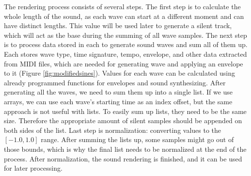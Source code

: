 \documentclass[runningheads]{llncs}
\begin{document}
The rendering process consists of several steps. The first step is to calculate the whole length of the sound, as each wave can start at a different moment and can have distinct lengths. This value will be used later to generate a silent track, which will act as the base during the summing of all wave samples. The next step is to process data stored in each  to generate sound waves and sum all of them up. Each  stores wave type, time signature, tempo, envelope, and other data extracted from MIDI files, which are needed for generating wave and applying an envelope to it (Figure \ref{fig:modifiedsines}). Values for each wave can be calculated using already programmed functions for envelopes and sound synthesizing. After generating all the waves, we need to sum them up into a single list. If we use arrays, we can use each wave’s starting time as an index offset, but the same approach is not useful with lists. To easily sum up lists, they need to be the same size. Therefore the appropriate amount of silent samples should be appended on both sides of the list. Last step is normalization\label{gloss:normalization}: converting values to the \([-1.0, 1.0]\) range. After summing the lists up, some samples might go out of those bounds, which is why the final list needs to be normalized at the end of the process. After normalization, the sound rendering is finished, and it can be used for later processing.
\end{document}
